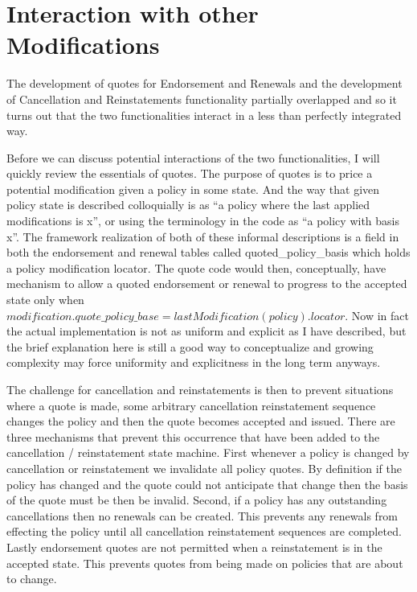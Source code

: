 \section{Interaction with other Modifications}
\label{sec:02:3}
The development of quotes for Endorsement and Renewals and the development of Cancellation and Reinstatements functionality
partially overlapped and so it turns out that the two functionalities interact in a less than perfectly integrated way.

Before we can discuss potential interactions of the two functionalities, I will quickly review the essentials of quotes. The
purpose of quotes is to price a potential modification given a policy in some state. And the way that given policy state is described
colloquially is as ``a policy where the last applied modifications is x'', or using the terminology in the code as ``a policy with basis x''. The
framework realization of both of these informal descriptions is a field in both the endorsement and
renewal tables called quoted\_policy\_basis which holds a policy modification locator. The quote code would then, conceptually, have
mechanism to allow a quoted endorsement or renewal to progress to the accepted state only when
$ modification.quote\_policy\_base = lastModification(policy).locator $. Now in
fact the actual implementation is not as uniform and explicit as I have described, but the brief explanation here is still a good way
to conceptualize and growing complexity may force uniformity and explicitness in the long term anyways.

The challenge for cancellation and reinstatements is then to prevent situations where a quote is made, some arbitrary cancellation
reinstatement sequence changes the policy and then the quote becomes accepted and issued. There are three mechanisms that
prevent this occurrence that have been added to the cancellation / reinstatement state machine. First whenever a policy is
changed by cancellation or reinstatement we invalidate all policy quotes. By definition if the policy has changed and the quote
could not anticipate that change then the basis of the quote must be then be invalid. Second, if a policy has any outstanding
cancellations then no renewals can be created. This prevents any renewals from effecting the policy until all cancellation
reinstatement sequences are completed. Lastly endorsement quotes are not permitted when a reinstatement is in the accepted state. This
prevents quotes from being made on policies that are about to change.
